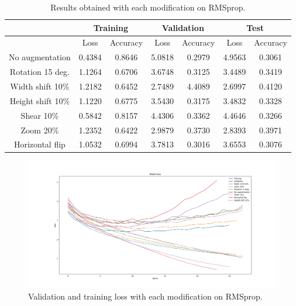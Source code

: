 \documentclass[]{article}
\begin{document}
\begin{table}[H]
	\centering
	\label{t:rms1}
	\begin{tabular}{@{}ccccccc@{}}
		\toprule
		& \multicolumn{2}{c}{Training} & \multicolumn{2}{c}{Validation} & \multicolumn{2}{c}{Test} \\ \midrule
		& Loss         & Accuracy      & Loss          & Accuracy       & Loss       & Accuracy    \\
		\midrule
		No augmentation   & 0.4384       & 0.8646        & 5.0818        & 0.2979         & 4.9563     & 0.3061      \\
		Rotation 15 deg.  & 1.1264       & 0.6706        & 3.6748        & 0.3125         & 3.4489     & 0.3419      \\
		Width shift 10\%  & 1.2182       & 0.6452        & 2.7489        & 4.4089         & 2.6997     & 0.4120      \\
		Height shift 10\% & 1.1220       & 0.6775        & 3.5430        & 0.3175         & 3.4832     & 0.3328      \\
		Shear 10\%        & 0.5842       & 0.8157        & 4.4306        & 0.3362         & 4.4646     & 0.3266      \\
		Zoom 20\%         & 1.2352       & 0.6422        & 2.9879        & 0.3730         & 2.8393     & 0.3971      \\
		Horizontal flip   & 1.0532       & 0.6994        & 3.7813        & 0.3016         & 3.6553     & 0.3076      \\ \bottomrule
	\end{tabular}
	\caption{Results obtained with each modification on RMSprop.}
\end{table}

\begin{figure}[H]
	\centering
	\includegraphics[width=\textwidth]{last1_loss}
	\caption{Validation and training loss with each modification on RMSprop.}
	\label{f:rms1}
\end{figure}
\end{document}
